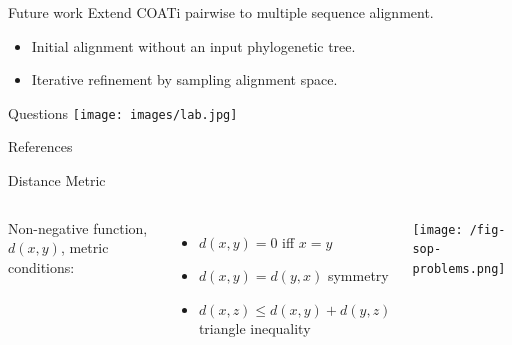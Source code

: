 \documentclass{beamer}
\begin{document}
\begin{frame}{Future work} %
Extend COATi pairwise to multiple sequence alignment.
\vspace{1em}
\begin{itemize}
	\setlength\itemsep{1em}
	\item Initial alignment without an input phylogenetic tree.
	\item Iterative refinement by sampling alignment space.
\end{itemize}
\end{frame} %

\begin{frame}{Questions} %
\texttt{[image: images/lab.jpg]}
\end{frame} %

\appendix %

\begin{frame}[t,allowframebreaks]{References} %
\printbibliography
\end{frame} %


\appendix %

\begin{frame}[noframenumbering]{Distance Metric} %
\begin{columns}
Non-negative function, $d(x,y)$, metric conditions:
\begin{itemize}
	\item $d(x,y) = 0$ iff $x=y$
	\item $d(x,y) = d(y,x)$ symmetry
	\item $d(x,z) \leq d(x,y) + d(y,z)$ triangle inequality
\end{itemize}
\texttt{[image: /fig-sop-problems.png]}
\end{columns}
\end{frame} %
\end{document}
